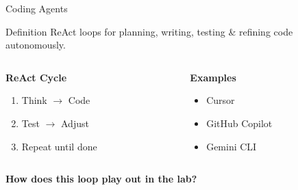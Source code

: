 \documentclass[aspectratio=169]{beamer}
\begin{document}
\begin{frame}{Coding Agents}
  \begin{block}{Definition}
    ReAct loops for planning, writing, testing \& refining code autonomously.
  \end{block}

  \vspace{0.5cm}

  \begin{columns}[T]
    \begin{column}{0.48\textwidth}
      \centering
      \large\bfseries
      \textcolor{conesaTeal}{ReAct Cycle}

      \vspace{0.3cm}
      \normalsize

      \begin{enumerate}
        \item Think $\rightarrow$ Code
        \item Test $\rightarrow$ Adjust
        \item Repeat until done
      \end{enumerate}
    \end{column}
    \begin{column}{0.48\textwidth}
      \centering
      \large\bfseries
      \textcolor{conesaOrange}{Examples}

      \vspace{0.3cm}
      \normalsize

      \begin{itemize}
        \item Cursor
        \item GitHub Copilot
        \item Gemini CLI
      \end{itemize}
    \end{column}
  \end{columns}

  \vspace{0.5cm}
  \centering
  \normalsize
  \textbf{How does this loop play out in the lab?}
\end{frame}
\end{document}
